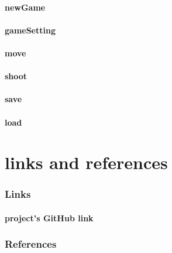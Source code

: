 \documentclass[12pt,a4paper]{article}
\begin{document}
	\subsection{newGame}
	\subsection{gameSetting}
	\subsection{move}
	\subsection{shoot}
	\subsection{save}
	\subsection{load}

	\newpage
	\setcounter{section}{0}
	\part{links and references}\label{linkAndRef}
	
	\section{Links}\label{linkAndRef.links}
	\subsection*{project's GitHub link}
	\href{https://github.com/Matin0789/FinalFight.git}{\color{blue}{https://github.com/Matin0789/FinalFight.git}}
	
	
	\section{References}\label{linkAndRef.ref}
	
\end{document}
